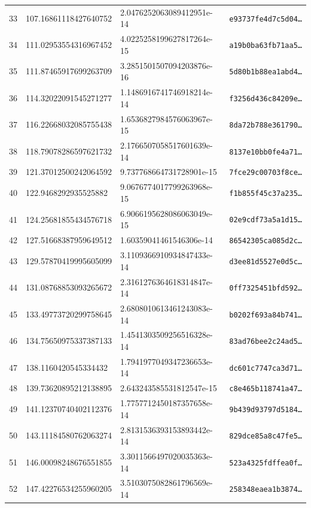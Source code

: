 \documentclass[11pt]{article}
\begin{document}
\begin{center}
\begin{longtable}{rlll}
33 & 107.16861118427640752 & 2.0476252063089412951e-14 & \texttt{e93737fe4d7c5d04\dots} \\
34 & 111.02953554316967452 & 4.0225258199627817264e-15 & \texttt{a19b0ba63fb71aa5\dots} \\
35 & 111.87465917699263709 & 3.2851501507094203876e-16 & \texttt{5d80b1b88ea1abd4\dots} \\
36 & 114.32022091545271277 & 1.1486916741746918214e-14 & \texttt{f3256d436c84209e\dots} \\
37 & 116.22668032085755438 & 1.6536827984576063967e-15 & \texttt{8da72b788e361790\dots} \\
38 & 118.79078286597621732 & 2.1766507058517601639e-14 & \texttt{8137e10bb0fe4a71\dots} \\
39 & 121.37012500242064592 & 9.737768664731728901e-15 & \texttt{7fce29c00703f8ce\dots} \\
40 & 122.9468292935525882 & 9.0676774017799263968e-15 & \texttt{f1b855f45c37a235\dots} \\
41 & 124.25681855434576718 & 6.9066195628086063049e-15 & \texttt{02e9cdf73a5a1d15\dots} \\
42 & 127.51668387959649512 & 1.60359041461546306e-14 & \texttt{86542305ca085d2c\dots} \\
43 & 129.57870419995605099 & 3.1109366910934847433e-14 & \texttt{d3ee81d5527e0d5c\dots} \\
44 & 131.08768853093265672 & 2.3161276364618314847e-14 & \texttt{0ff7325451bfd592\dots} \\
45 & 133.49773720299758645 & 2.6808010613461243083e-14 & \texttt{b0202f693a84b741\dots} \\
46 & 134.75650975337387133 & 1.4541303509256516328e-14 & \texttt{83ad76bee2c24ad5\dots} \\
47 & 138.1160420545334432 & 1.7941977049347236653e-14 & \texttt{dc601c7747ca3d71\dots} \\
48 & 139.73620895212138895 & 2.643243585531812547e-15 & \texttt{c8e465b118741a47\dots} \\
49 & 141.12370740402112376 & 1.7757712450187357658e-14 & \texttt{9b439d93797d5184\dots} \\
50 & 143.11184580762063274 & 2.8131536393153893442e-14 & \texttt{829dce85a8c47fe5\dots} \\
51 & 146.00098248676551855 & 3.3011566497020035363e-14 & \texttt{523a4325fdffea0f\dots} \\
52 & 147.42276534255960205 & 3.5103075082861796569e-14 & \texttt{258348eaea1b3874\dots} \\

\end{longtable}
\end{center}
\end{document}
